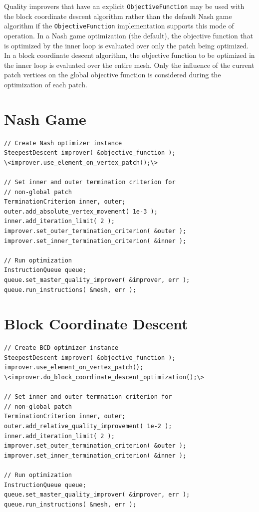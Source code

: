 Quality improvers that have an explicit \texttt{ObjectiveFunction} may be used with the block coordinate descent algorithm rather than the default Nash game algorithm if the \texttt{ObjectiveFunction} implementation supports this mode of operation. In a Nash game optimization (the default), the objective function that is optimized by the inner loop is evaluated over only the patch being optimized.  In a block coordinate descent algorithm, the objective function to be optimized in the inner loop is evaluated over the entire mesh.  Only the influence of the current patch vertices on the global objective function is considered during the optimization of each patch.

\section{Nash Game \label{sec:nash} }


\begin{lstlisting}[frame=single]
// Create Nash optimizer instance
SteepestDescent improver( &objective_function );
\<improver.use_element_on_vertex_patch();\>

// Set inner and outer termination criterion for
// non-global patch
TerminationCriterion inner, outer;
outer.add_absolute_vertex_movement( 1e-3 );
inner.add_iteration_limit( 2 );
improver.set_outer_termination_criterion( &outer );
improver.set_inner_termination_criterion( &inner );

// Run optimization
InstructionQueue queue;
queue.set_master_quality_improver( &improver, err );
queue.run_instructions( &mesh, err );
\end{lstlisting}


\section{Block Coordinate Descent \label{sec:bcd} }

\begin{lstlisting}[frame=single]
// Create BCD optimizer instance
SteepestDescent improver( &objective_function );
improver.use_element_on_vertex_patch();
\<improver.do_block_coordinate_descent_optimization();\>

// Set inner and outer termnation criterion for
// non-global patch
TerminationCriterion inner, outer;
outer.add_relative_quality_improvement( 1e-2 );
inner.add_iteration_limit( 2 );
improver.set_outer_termination_criterion( &outer );
improver.set_inner_termination_criterion( &inner );

// Run optimization
InstructionQueue queue;
queue.set_master_quality_improver( &improver, err );
queue.run_instructions( &mesh, err );
\end{lstlisting}



